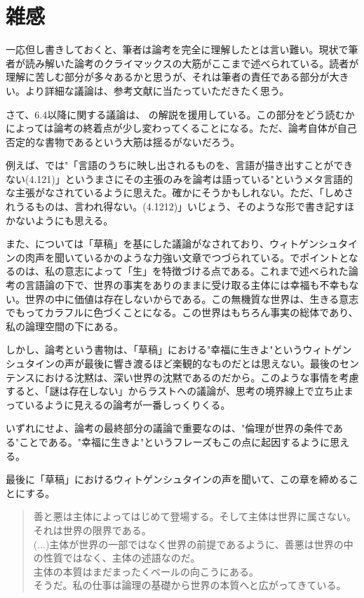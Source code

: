 \documentclass[11pt,a4paper]{jsbook}
\begin{document}
\section{雑感}
一応但し書きしておくと、筆者は論考を完全に理解したとは言い難い。現状で筆者が読み解いた論考のクライマックスの大筋がここまで述べられている。読者が理解に苦しむ部分が多々あるかと思うが、それは筆者の責任である部分が大きい。より詳細な議論は、参考文献に当たっていただきたく思う。
\par
さて、6.4以降に関する議論は、\cite{光文社} の解説を援用している。この部分をどう読むかによっては論考の終着点が少し変わってくることになる。ただ、論考自体が自己否定的な書物であるという大筋は揺るがないだろう。
\par
例えば、\cite{入門}では"「言語のうちに映し出されるものを、言語が描き出すことができない(4.121)」というまさにその主張のみを論考は語っている"というメタ言語的な主張がなされているように思えた。確かにそうかもしれない。ただ、「しめされうるものは、言われ得ない。(4.1212)」いじょう、そのような形で書き記すほかないようにも思える。
\par
また、\cite{読む, 岩波}については「草稿」を基にした議論がなされており、ウィトゲンシュタインの肉声を聞いているかのような力強い文章でつづられている。\cite{読む, 岩波}でポイントとなるのは、私の意志によって「生」を特徴づける点である。これまで述べられた論考の言語論の下で、世界の事実をありのままに受け取る主体には幸福も不幸もない。世界の中に価値は存在しないからである。この無機質な世界は、生きる意志でもってカラフルに色づくことになる。この世界はもちろん事実の総体であり、私の論理空間の下にある。
\par
しかし、論考という書物は、「草稿」における"幸福に生きよ"というウィトゲンシュタインの声が最後に響き渡るほど楽観的なものだとは思えない。最後のセンテンスにおける沈黙は、深い世界の沈黙であるのだから。このような事情を考慮すると、「謎は存在しない」からラストへの議論が、思考の境界線上で立ち止まっているように見える\cite{光文社}の論考が一番しっくりくる。
\par
いずれにせよ、論考の最終部分の議論で重要なのは、"倫理が世界の条件である"ことである。"幸福に生きよ"というフレーズもこの点に起因するように思える。
\par
最後に「草稿」におけるウィトゲンシュタインの声を聞いて、この章を締めることにする。

\begin{quote}
善と悪は主体によってはじめて登場する。そして主体は世界に属さない。それは世界の限界である。\\
(...)主体が世界の一部ではなく世界の前提であるように、善悪は世界の中の性質ではなく、主体の述語なのだ。\\
主体の本質はまだまったくベールの向こうにある。\\
そうだ。私の仕事は論理の基礎から世界の本質へと広がってきている。
\end{quote}
\end{document}
